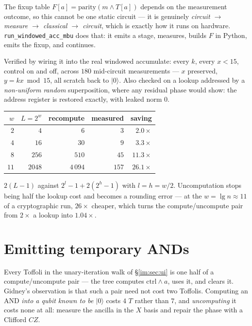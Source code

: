 \documentclass[11pt]{article}
\renewcommand{\ket}[1]{\lvert #1 \rangle}
\newcommand{\code}[1]{\texttt{#1}}
\theoremstyle{plain}
\theoremstyle{remark}
\begin{document}
\begin{keybox}[title={Wiring it in: the classical controller sits in the middle}]
The fixup table $F[a]=\mathrm{parity}(m\wedge T[a])$ depends on the measurement outcome, so this
cannot be one static circuit --- it is genuinely
\emph{circuit $\to$ measure $\to$ classical $\to$ circuit}, which is exactly how it runs on
hardware. \code{run\_windowed\_acc\_mbu} does that: it emits a stage, measures, builds $F$ in
Python, emits the fixup, and continues.

Verified by wiring it into the real windowed accumulate: every $k$, every $x<15$, control on and
off, across $180$ mid-circuit measurements --- $x$ preserved, $y=kx\bmod15$, all scratch back to
$\ket0$. Also checked on a lookup addressed by a \emph{non-uniform random} superposition, where any
residual phase would show: the address register is restored exactly, with leaked norm $0$.

\begin{center}\small
\begin{tabular}{@{}rrrrr@{}}
\toprule
$w$ & $L=2^w$ & recompute & measured & saving\\
\midrule
$2$  & $4$    & $6$     & $3$   & $2.0\times$\\
$4$  & $16$   & $30$    & $9$   & $3.3\times$\\
$8$  & $256$  & $510$   & $45$  & $11.3\times$\\
$11$ & $2048$ & $4\,094$ & $157$ & $26.1\times$\\
\bottomrule
\end{tabular}
\end{center}

\noindent
$2(L{-}1)$ against $2^{l}{-}1+2(2^{h}{-}1)$ with $l=h=w/2$. Uncomputation stops being half the
lookup cost and becomes a rounding error --- at the $w=\lg n\approx11$ of a cryptographic run,
$26\times$ cheaper, which turns the compute/uncompute pair from $2\times$ a lookup into
$1.04\times$.
\end{keybox}

\section{Emitting temporary ANDs}\label{sec:tempand}

Every Toffoli in the unary-iteration walk of \S\ref{im:sec:ui} is one half of a compute/uncompute
pair --- the tree computes $\mathrm{ctrl}\wedge a$, uses it, and clears it. Gidney's observation
\cite{gidney-and} is that such a pair need not cost two Toffolis. Computing an AND \emph{into a
qubit known to be $\ket0$} costs $4$ $T$ rather than $7$, and \emph{uncomputing} it costs none at
all: measure the ancilla in the $X$ basis and repair the phase with a Clifford $CZ$.
\end{document}
